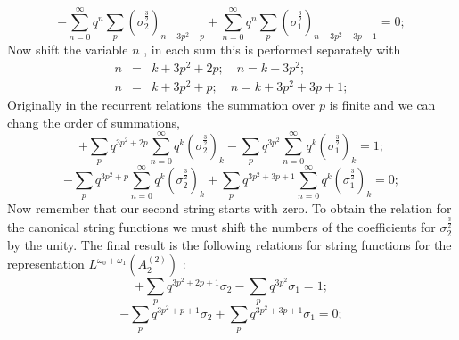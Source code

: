 \documentclass{article}
\begin{document}
\begin{equation*}
-\sum_{n=0}^{\infty }q^{n}\sum_{p}\left( \sigma _{2}^{\frac{3}{2}}\right)
_{n-3p^{2}-p}+\sum_{n=0}^{\infty }q^{n}\sum_{p}\left( \sigma _{1}^{\frac{3}{2%
}}\right) _{n-3p^{2}-3p-1}=0;
\end{equation*}
Now shift the variable $n$ , in each sum this is performed separately with
\begin{eqnarray*}
n &=&k+3p^{2}+2p;\quad n=k+3p^{2}; \\
n &=&k+3p^{2}+p;\quad n=k+3p^{2}+3p+1;
\end{eqnarray*}
Originally in the recurrent relations the summation over $p$ is finite and
we can chang the order of summations,
\begin{equation*}
+\sum_{p}q^{3p^{2}+2p}\sum_{n=0}^{\infty }q^{k}\left( \sigma _{2}^{\frac{3}{2%
}}\right) _{k}-\sum_{p}q^{3p^{2}}\sum_{n=0}^{\infty }q^{k}\left( \sigma
_{1}^{\frac{3}{2}}\right) _{k}=1;
\end{equation*}
\begin{equation*}
-\sum_{p}q^{3p^{2}+p}\sum_{n=0}^{\infty }q^{k}\left( \sigma _{2}^{\frac{3}{2}%
}\right) _{k}+\sum_{p}q^{3p^{2}+3p+1}\sum_{n=0}^{\infty }q^{k}\left( \sigma
_{1}^{\frac{3}{2}}\right) _{k}=0;
\end{equation*}
Now remember that our second string starts with zero. To obtain the relation
for the canonical string functions we must shift the numbers of the
coefficients for $\sigma _{2}^{\frac{3}{2}}$ by the unity. The final result
is the following relations for string functions for the representation $%
L^{\omega _{0}+\omega _{1}}(A_{2}^{\left( 2\right) })$ :
\begin{equation*}
+\sum_{p}q^{3p^{2}+2p+1}\sigma _{2}-\sum_{p}q^{3p^{2}}\sigma _{1}=1;
\end{equation*}
\begin{equation*}
-\sum_{p}q^{3p^{2}+p+1}\sigma _{2}+\sum_{p}q^{3p^{2}+3p+1}\sigma _{1}=0;
\end{equation*}
\end{document}

